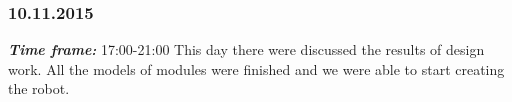 \subsubsection{10.11.2015}
	\textit{\textbf{Time frame:}} 17:00-21:00 \newline
	This day there were discussed the results of design work. All the models of modules were finished and we were able to start creating the robot.
  	
